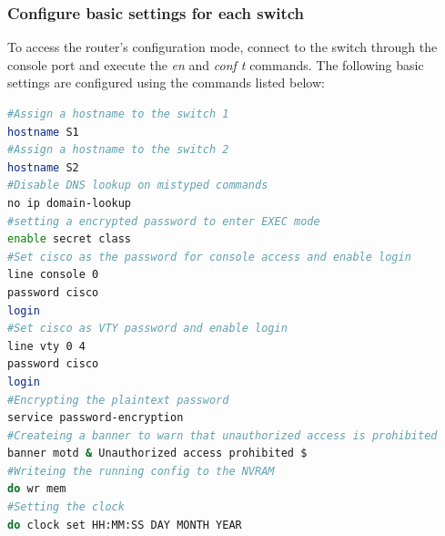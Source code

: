 \documentclass[a4paper]{article}
\newcommand{\abc}{\hfill \break}
\newcommand{\ii}{\textit}
\begin{document}
\subsubsection{Configure basic settings for each switch}
To access the router's configuration mode, connect to the switch through the console port and execute the \ii{en} and \ii{conf t} commands.\abc
The following basic settings are configured using the commands listed below:
\begin{lstlisting}[language=bash]
#Assign a hostname to the switch 1
hostname S1
#Assign a hostname to the switch 2
hostname S2
#Disable DNS lookup on mistyped commands
no ip domain-lookup
#setting a encrypted password to enter EXEC mode
enable secret class
#Set cisco as the password for console access and enable login
line console 0
password cisco
login
#Set cisco as VTY password and enable login
line vty 0 4
password cisco
login
#Encrypting the plaintext password
service password-encryption
#Createing a banner to warn that unauthorized access is prohibited
banner motd & Unauthorized access prohibited $
#Writeing the running config to the NVRAM
do wr mem
#Setting the clock
do clock set HH:MM:SS DAY MONTH YEAR
\end{lstlisting}
\end{document}
